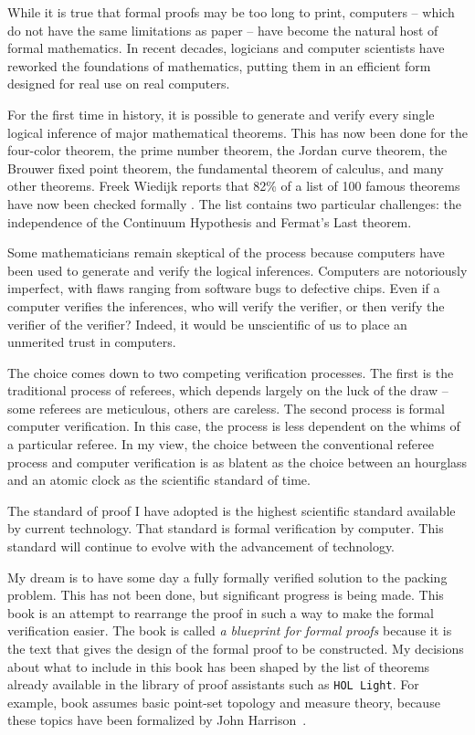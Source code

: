 While it is true that formal proofs may be too long to print,
computers -- which do not have the same limitations as paper -- have
become the natural host of formal mathematics. In recent decades,
logicians and computer scientists have reworked the foundations of
mathematics, putting them in an efficient form designed for real use
on real computers.

For the first time in history, it is possible to generate and verify
every single logical inference of major mathematical theorems.  This
has now been done for the four-color theorem, the prime number
theorem, the Jordan curve theorem, the Brouwer fixed point theorem,
the fundamental theorem of calculus, and many other theorems.  Freek
Wiedijk reports that 82\% of a list of 100 famous theorems have now
been checked formally \cite{wiedijk:100}.  The list contains two particular challenges: the independence of the Continuum Hypothesis and Fermat's Last theorem.

Some mathematicians remain skeptical of the process because
computers have been used to generate and verify the logical
inferences.  Computers are notoriously imperfect, with flaws ranging
from software bugs to defective chips.  Even if a computer verifies
the inferences, who will verify the verifier, or then verify the
verifier of the verifier?  Indeed, it would be unscientific of us to
place an unmerited trust in computers.

The choice comes down to two competing verification processes.  The first is the traditional
process of referees, which depends largely on the luck of the draw
-- some referees are meticulous, others are careless.   The second
process is formal computer verification. In this case, the process
is less dependent on the whims of a particular referee.
In my view, the choice between the conventional referee process and
computer verification is as blatent as the choice between an
hourglass and an atomic clock as the scientific standard of time.

The standard of proof I have adopted is the highest scientific standard
available by current technology.  That 
standard is formal verification by computer.  This standard will
continue to evolve with the advancement of technology.

My dream is to have some day a fully formally verified solution to
the packing problem.
This has not been done, but significant progress is being
made.  This book is an attempt to rearrange the proof
in such a way to make the formal verification easier.  The book is called {\it a blueprint for formal proofs} because it is the text that gives the design of the formal proof to be constructed.  My decisions about what to include in this book has been shaped by the list of theorems already available in the library of proof assistants such as {\tt HOL Light}.  For example, book assumes basic point-set topology and measure theory, because these topics have been formalized by John Harrison~\cite{XX}.  

